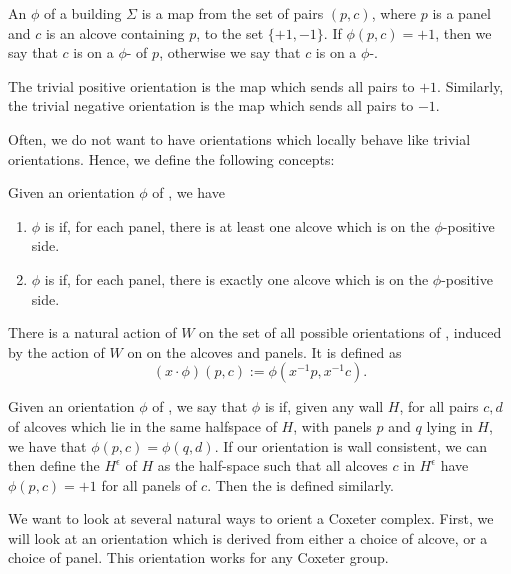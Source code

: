 \documentclass[11pt]{article}
\begin{document}
\begin{definition}
    An  $\phi$ of a building $\Sigma$ is a map from the set of pairs $(p,c)$, where $p$ is a panel and $c$ is an alcove containing $p$, to the set $\{+1,-1\}$. If $\phi (p,c)=+1$, then we say that $c$ is on a $\phi$- of $p$, otherwise we say that $c$ is on a $\phi$-. 
\end{definition}


\begin{example}
    The trivial positive orientation is the map which sends all pairs to $+1$. Similarly, the trivial negative orientation is the map which sends all pairs to $-1$. 
\end{example}

Often, we do not want to have orientations which locally behave like trivial orientations. Hence, we define the following concepts:

\begin{definition}
    Given an orientation $\phi$ of \sg, we have
    \begin{enumerate}
        \item $\phi$ is  if, for each panel, there is at least one alcove which is on the $\phi$-positive side.
        \item $\phi$ is  if, for each panel, there is exactly one alcove which is on the $\phi$-positive side.
    \end{enumerate}
\end{definition}


There is a natural action of $W$ on the set of all possible orientations of \sg, induced by the action of $W$ on on the alcoves and panels. It is defined as 
\[(x\cdot\phi)(p,c):=\phi(x^{-1}p,x^{-1}c).\]

\begin{definition}
    Given an orientation $\phi$ of \sg, we say that $\phi$ is  if, given any wall $H$, for all pairs $c,d$ of alcoves which lie in the same halfspace of $H$, with panels $p$ and $q$ lying in $H$, we have that $\phi(p,c)=\phi(q,d)$. If our orientation is wall consistent, we can then define the  $H^{\epsilon}$ of $H$ as the half-space such that all alcoves $c$ in $H^{\epsilon}$ have $\phi(p,c)=+1$ for all panels of $c$. Then the  is defined similarly.
\end{definition}

We want to look at several natural ways to orient a Coxeter complex. First, we will look at an orientation which is derived from either a choice of alcove, or a choice of panel. This orientation works for any Coxeter group.
\end{document}
